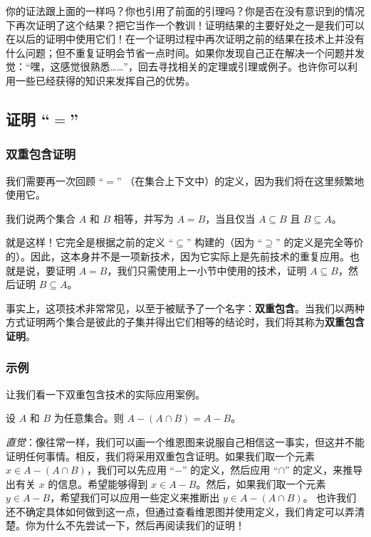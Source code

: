你的证法跟上面的一样吗？你也引用了前面的引理吗？你是否在没有意识到的情况下再次证明了这个结果？把它当作一个教训！证明结果的主要好处之一是我们可以在以后的证明中使用它们！在一个证明过程中再次证明之前的结果在技术上并没有什么问题；但不重复证明会节省一点时间。如果你发现自己正在解决一个问题并发觉：“嘿，这感觉很熟悉……”，回去寻找相关的定理或引理或例子。也许你可以利用一些已经获得的知识来发挥自己的优势。

\subsection{证明 ``$=$''}

\subsubsection*{双重包含证明}

我们需要再一次回顾 ``$=$'' （在集合上下文中）的定义，因为我们将在这里频繁地使用它。

\begin{definition}
    我们说两个集合 $A$ 和 $B$ 相等，并写为 $A = B$，当且仅当 $A \subseteq B$ 且 $B \subseteq A$。
\end{definition}

就是这样！它完全是根据之前的定义 ``$\subseteq$'' 构建的（因为 ``$\supseteq$'' 的定义是完全等价的）。因此，这本身并不是一项新技术，因为它实际上是先前技术的重复应用。也就是说，要证明 $A = B$，我们只需使用上一小节中使用的技术，证明 $A \subseteq B$，然后证明 $B \subseteq A$。

事实上，这项技术非常常见，以至于被赋予了一个名字：\textbf{双重包含}。当我们以两种方式证明两个集合是彼此的子集并得出它们相等的结论时，我们将其称为\textbf{双重包含证明}。

\subsubsection*{示例}

让我们看一下双重包含技术的实际应用案例。

\begin{lemma}
    设 $A$ 和 $B$ 为任意集合。则 $A - (A \cap B) = A - B$。
\end{lemma}

\emph{直觉}：像往常一样，我们可以画一个维恩图来说服自己相信这一事实，但这并不能证明任何事情。相反，我们将采用双重包含证明。如果我们取一个元素 $x \in A - (A \cap B)$，我们可以先应用 ``$-$'' 的定义，然后应用 ``$\cap$'' 的定义，来推导出有关 $x$ 的信息。希望能够得到 $x \in A - B$。然后，如果我们取一个元素 $y \in A - B$，希望我们可以应用一些定义来推断出 $y \in A - (A \cap B)$。 也许我们还不确定具体如何做到这一点，但通过查看维恩图并使用定义，我们肯定可以弄清楚。你为什么不先尝试一下，然后再阅读我们的证明！

